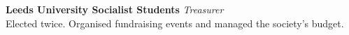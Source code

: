 %
\textbf{Leeds University Socialist Students}  \newline
\emph{Treasurer}\\
Elected twice. Organised fundraising events and managed the society's budget.

